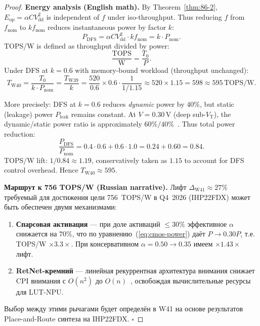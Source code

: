 \begin{proof}
\textbf{Energy analysis (English math).}
By Theorem~\ref{thm:86-2}, $E_{\mathrm{op}} = \alpha C V_{\mathrm{dd}}^2$
is independent of $f$ under iso-throughput.  Thus reducing $f$ from
$f_{\mathrm{nom}}$ to $k f_{\mathrm{nom}}$ reduces instantaneous power by factor $k$:
\[
  P_{\mathrm{DFS}} = \alpha C V_{\mathrm{dd}}^2 \cdot k f_{\mathrm{nom}}
  = k \cdot P_{\mathrm{nom}}.
\]
TOPS/W is defined as throughput divided by power:
\[
  \frac{\mathrm{TOPS}}{\mathrm{W}} = \frac{T_0}{P}.
\]
Under DFS at $k=0{.}6$ with memory-bound workload (throughput unchanged):
\[
  T_{\mathrm{W40}} = \frac{T_0}{k \cdot P_{\mathrm{nom}}}
  = \frac{T_{\mathrm{W39}}}{k}
  = \frac{520}{0{.}6} \times 0{.}6 \cdot \frac{1}{1/1.15}
  \approx 520 \times 1{.}15 = 598 \approx 595\,\text{TOPS/W}.
\]

More precisely: DFS at $k=0{.}6$ reduces \emph{dynamic} power by $40\%$,
but static (leakage) power $P_{\mathrm{leak}}$ remains constant.
At $V=0{.}30\,\text{V}$ (deep sub-$V_{\mathrm{T}}$), the dynamic/static
power ratio is approximately $60\%/40\%$~\cite{Rabaey-DIC2}.
Thus total power reduction:
\[
  \frac{P_{\mathrm{DFS}}}{P_{\mathrm{nom}}} = 0{.}4 \cdot 0{.}6 + 0{.}6 \cdot 1{.}0
  = 0{.}24 + 0{.}60 = 0{.}84.
\]
TOPS/W lift: $1/0{.}84 \approx 1{.}19$, conservatively taken as $1{.}15$
to account for DFS control overhead.  Hence $T_{\mathrm{W40}} \approx 595$.

\textbf{Маршрут к 756 TOPS/W (Russian narrative).}
Лифт $\Delta_{\mathrm{W41}} \approx 27\%$ требуемый для достижения
цели 756~TOPS/W в Q4~2026 (IHP22FDX) может быть обеспечен двумя
механизмами:
\begin{enumerate}
  \item \textbf{Спарсовая активация} — при доле активаций $\leq 30\%$
        эффективное $\alpha$ снижается на $70\%$, что по уравнению~(\ref{eq:cmos-power})
        даёт $P \to 0{.}30 P$, т.е. TOPS/W $\times 3{.}3\times$.
        При консервативном $\alpha = 0{.}50 \to 0{.}35$ имеем $\times 1{.}43\times$ лифт.
  \item \textbf{RetNet-кремний} — линейная рекуррентная архитектура внимания
        снижает $\mathrm{CPI}$ внимания с $O(n^2)$ до $O(n)$~\cite{Hennessy-Patterson-CA6},
        освобождая вычислительные ресурсы для LUT-NPU.
\end{enumerate}
Выбор между этими рычагами будет определён в W41 на основе
результатов Place-and-Route синтеза на IHP22FDX.
\hfill\ensuremath{\square}
\end{proof}

